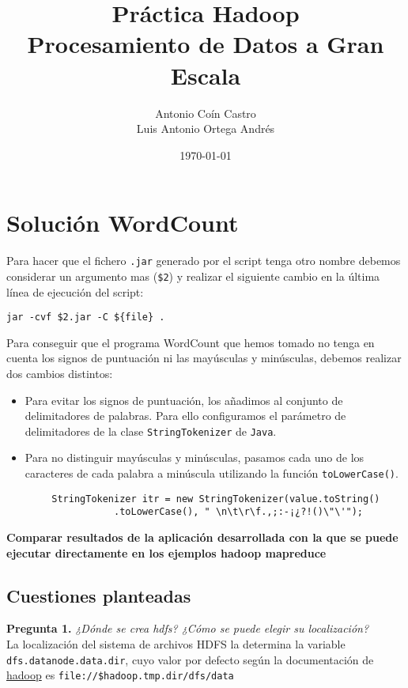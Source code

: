 \documentclass[11pt]{article}
\author{Antonio Coín Castro\\ Luis Antonio Ortega Andrés}
\date{\today}
\title{Práctica Hadoop\\\medskip
\large Procesamiento de Datos a Gran Escala}
\begin{document}
\maketitle

\section*{Solución WordCount}

Para hacer que el fichero \texttt{.jar} generado por el script tenga otro nombre debemos considerar un argumento mas (\texttt{\$2}) y realizar el siguiente cambio en la última línea de ejecución del script:

\begin{verbatim}
jar -cvf $2.jar -C ${file} .
\end{verbatim}


Para conseguir que el programa WordCount que hemos tomado no tenga en cuenta los signos de puntuación ni las mayúsculas y minúsculas, debemos realizar dos cambios distintos:
\begin{itemize}
  \item Para evitar los signos de puntuación, los añadimos al conjunto de delimitadores de palabras. Para ello configuramos el parámetro de delimitadores de la clase \texttt{StringTokenizer} de \texttt{Java}.
  \item Para no distinguir mayúsculas y minúsculas, pasamos cada uno de los caracteres de cada palabra a minúscula utilizando la función \texttt{toLowerCase()}.
\end{itemize}
  \begin{verbatim}
        StringTokenizer itr = new StringTokenizer(value.toString()
                   .toLowerCase(), " \n\t\r\f.,;:-¡¿?!()\"\'");
\end{verbatim}

\textbf{Comparar resultados de la aplicación desarrollada con la que
se puede ejecutar directamente en los ejemplos hadoop mapreduce}


\subsection*{Cuestiones planteadas}

\textbf{Pregunta 1. }\emph{¿Dónde se crea hdfs? ¿Cómo se puede elegir su localización?}\\

La localización del sistema de archivos HDFS la determina la variable \texttt{dfs.datanode.data.dir}, cuyo valor por defecto según la documentación de \href{https://hadoop.apache.org/docs/r2.4.1/hadoop-project-dist/hadoop-hdfs/hdfs-default.xml}{hadoop} es \texttt{file://\${hadoop.tmp.dir}/dfs/data}
\end{document}
